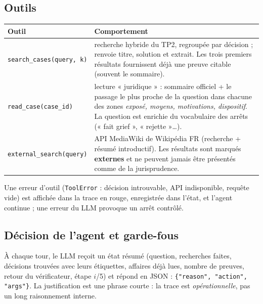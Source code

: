 \documentclass[11pt,a4paper]{article}
\begin{document}
\subsection{Outils}
\begin{center}\small
\begin{tabularx}{\textwidth}{@{}l X@{}}
\toprule
Outil & Comportement \\ \midrule
\texttt{search\_cases(query, k)} & recherche hybride du TP2, regroupée par décision ; renvoie titre, solution et extrait. Les trois premiers résultats fournissent déjà une preuve citable (souvent le sommaire). \\
\texttt{read\_case(case\_id)} & lecture « juridique » : sommaire officiel + le passage le plus proche de la question dans chacune des zones \emph{exposé, moyens, motivations, dispositif}. La question est enrichie du vocabulaire des arrêts (« fait grief », « rejette »\ldots). \\
\texttt{external\_search(query)} & API MediaWiki de Wikipédia FR (recherche + résumé introductif). Les résultats sont marqués \textbf{externes} et ne peuvent jamais être présentés comme de la jurisprudence. \\
\bottomrule
\end{tabularx}
\end{center}
Une erreur d'outil (\texttt{ToolError} : décision introuvable, API indisponible, requête vide) est
affichée dans la trace en rouge, enregistrée dans l'état, et l'agent continue ; une erreur du LLM
provoque un arrêt contrôlé.

\subsection{Décision de l'agent et garde-fous}
À chaque tour, le LLM reçoit un état résumé (question, recherches faites, décisions trouvées avec leurs
étiquettes, affaires déjà lues, nombre de preuves, retour du vérificateur, étape $i$/5) et répond en JSON :
\texttt{\{"reason", "action", "args"\}}. La justification est une phrase courte : la trace est
\emph{opérationnelle}, pas un long raisonnement interne.
\end{document}

